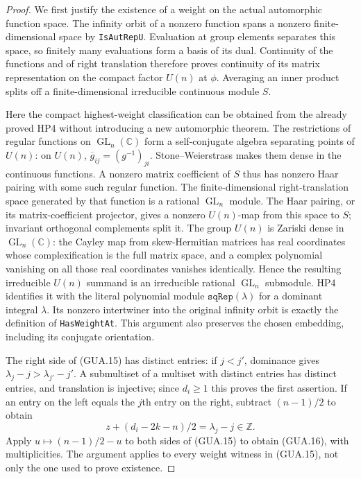 \begin{proof}
We first justify the existence of a weight on the actual
automorphic function space.  The infinity orbit of a
nonzero function spans a nonzero finite-dimensional space
by \texttt{IsAutRepU}.  Evaluation at group elements
separates this space, so finitely many evaluations form
a basis of its dual.  Continuity of the functions and
of right translation therefore proves continuity of
its matrix representation on the compact factor
$U(n)$ at $\phi$.  Averaging an inner product splits
off a finite-dimensional irreducible continuous module $S$.

Here the compact highest-weight classification can be
obtained from the already proved HP4 without introducing
a new automorphic theorem.  The restrictions of regular
functions on $\operatorname{GL}_n(\mathbb C)$ form a
self-conjugate algebra separating points of $U(n)$:
on $U(n)$, $\overline{g}_{ij}=(g^{-1})_{ji}$.
Stone--Weierstrass makes them dense in the continuous
functions.  A nonzero matrix coefficient of $S$ thus
has nonzero Haar pairing with some such regular function.
The finite-dimensional right-translation space generated
by that function is a rational $\operatorname{GL}_n$
module.  The Haar pairing, or its matrix-coefficient
projector, gives a nonzero $U(n)$-map from this space
to $S$; invariant orthogonal complements split it.
The group $U(n)$ is Zariski dense in
$\operatorname{GL}_n(\mathbb C)$: the Cayley map from
skew-Hermitian matrices has real coordinates whose
complexification is the full matrix space, and a complex
polynomial vanishing on all those real coordinates
vanishes identically.  Hence the resulting irreducible
$U(n)$ summand is an irreducible rational
$\operatorname{GL}_n$ submodule.  HP4 identifies it
with the literal polynomial module
$\texttt{sqRep}(\lambda)$ for a dominant integral
$\lambda$.  Its nonzero intertwiner into the original
infinity orbit is exactly the definition of
\texttt{HasWeightAt}.  This argument also preserves
the chosen embedding, including its conjugate orientation.

The right side of (GUA.15) has distinct entries:
if $j<j'$, dominance gives
$\lambda_j-j>\lambda_{j'}-j'$.  A submultiset of a
multiset with distinct entries has distinct entries,
and translation is injective; since $d_i\geq1$ this
proves the first assertion.  If an entry on the left
equals the $j$th entry on the right, subtract
$(n-1)/2$ to obtain
\[
          z+(d_i-2k-n)/2=\lambda_j-j\in\mathbb Z.
\]
Apply $u\mapsto(n-1)/2-u$ to both sides of
(GUA.15) to obtain (GUA.16), with multiplicities.
The argument applies to every weight witness in
(GUA.15), not only the one used to prove existence.
\end{proof}

